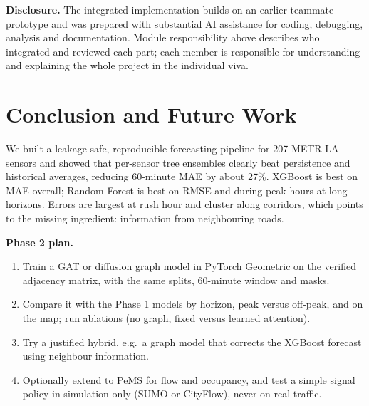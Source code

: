 \documentclass[conference]{IEEEtran}
\begin{document}
\textbf{Disclosure.} The integrated implementation builds on an earlier teammate prototype and was prepared with substantial AI assistance for coding, debugging, analysis and documentation. Module responsibility above describes who integrated and reviewed each part; each member is responsible for understanding and explaining the whole project in the individual viva.

\section{Conclusion and Future Work}
We built a leakage-safe, reproducible forecasting pipeline for 207 METR-LA sensors and showed that per-sensor tree ensembles clearly beat persistence and historical averages, reducing 60-minute MAE by about 27\%. XGBoost is best on MAE overall; Random Forest is best on RMSE and during peak hours at long horizons. Errors are largest at rush hour and cluster along corridors, which points to the missing ingredient: information from neighbouring roads.

\textbf{Phase 2 plan.}
\begin{enumerate}
\item Train a GAT or diffusion graph model in PyTorch Geometric on the verified adjacency matrix, with the same splits, 60-minute window and masks.
\item Compare it with the Phase 1 models by horizon, peak versus off-peak, and on the map; run ablations (no graph, fixed versus learned attention).
\item Try a justified hybrid, e.g.\ a graph model that corrects the XGBoost forecast using neighbour information.
\item Optionally extend to PeMS for flow and occupancy, and test a simple signal policy in simulation only (SUMO or CityFlow), never on real traffic.
\end{enumerate}
\end{document}
